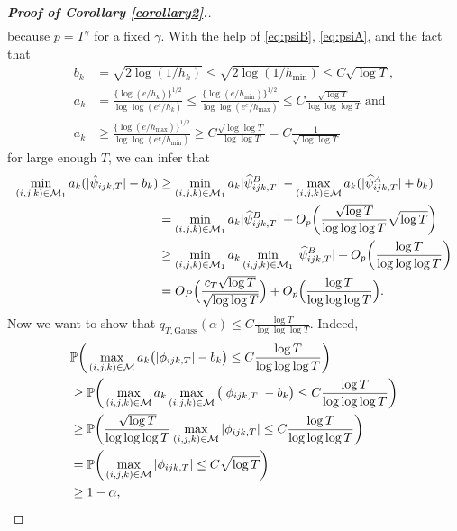 \documentclass[a4paper,12pt]{article}
\numberwithin{equation}{section}
\begin{document}
\begin{proof}[\textnormal{\textbf{Proof of Corollary \ref{corollary2}.}}]
\begin{align}
\end{align}
because $p = T^{\gamma}$ for a fixed $\gamma$. With the help of \eqref{eq:psiB}, \eqref{eq:psiA}, and the fact that 
\begin{align*}
b_k &= \sqrt{2 \log(1/h_k)} \le \sqrt{2 \log(1/h_{\min})} \le C \sqrt{\log T}, \\
a_k &= \frac{\{\log(e/h_k)\}^{1/2}}{ \log \log(e^e / h_k) }\le \frac{\{\log(e/h_{\min})\}^{1/2} }{\log \log(e^e / h_{\max})} \le C\frac{\sqrt{\log T}}{\log \log \log T} \text{ and}\\
a_k & \ge \frac{\{\log(e/h_{\max})\}^{1/2} }{\log \log(e^e / h_{\min})} \ge C\frac{\sqrt{\log \log T}}{\log \log T} = C \frac{1}{\sqrt{\log \log T}}
\end{align*}
for large enough $T$, we can infer that
\begin{align}
\min_{(i,j,k) \in \mathcal{M}_1} a_k (|\hat{\psi}_{ijk,T}| - b_k) & \ge \min_{(i, j, k) \in \mathcal{M}_1} a_k |\widehat{\psi}_{ijk, T}^B| - \max_{(i, j, k) \in \mathcal{M}} a_k (|\widehat{\psi}_{ijk, T}^A| + b_k) \nonumber \\
 & = \min_{(i, j, k) \in \mathcal{M}_1} a_k |\widehat{\psi}_{ijk, T}^B| + O_p\bigg(\frac{\sqrt{\log T}}{\log \log \log T} \sqrt{\log T}\bigg) \nonumber \\
 & \ge \min_{(i, j, k) \in \mathcal{M}_1} a_k  \min_{(i, j, k) \in \mathcal{M}_1} |\widehat{\psi}_{ijk, T}^B| + O_p\bigg(\frac{\log T}{\log \log \log T} \bigg) \nonumber \\
 & = O_P\Big( \frac{c_T \sqrt{\log T}}{\sqrt{\log \log T}}\Big) + O_p\Big(\frac{\log T}{\log \log \log T}\Big). \label{eq-proof-prop-test-2-conclusion}
\end{align}
Now we want to show that $q_{T, \text{Gauss}} (\alpha) \leq C \frac{\log T}{\log \log \log T}$. Indeed,
\begin{align*}
&\mathbb{P} \bigg(\max_{(i,j,k) \in \mathcal{M}} a_k \big( |\phi_{ijk,T}| - b_k \big) \le C \frac{\log T}{\log \log \log T}\bigg)\\
&\ge \mathbb{P} \bigg(\max_{(i,j,k) \in \mathcal{M}} a_k  \max_{(i,j,k) \in \mathcal{M}} \big( |\phi_{ijk,T}| - b_k \big) \le C \frac{\log T}{\log \log \log T}\bigg)\\
&\ge \mathbb{P} \bigg(\frac{\sqrt{\log T}}{\log \log \log T}  \max_{(i,j,k) \in \mathcal{M}} |\phi_{ijk,T}|  \le C \frac{\log T}{\log \log \log T}\bigg)\\
&= \mathbb{P} \bigg(\max_{(i,j,k) \in \mathcal{M}} |\phi_{ijk,T}| \le C \sqrt{\log T}\bigg)\\
& \ge 1 - \alpha,
\end{align*}

\end{proof}
\end{document}
